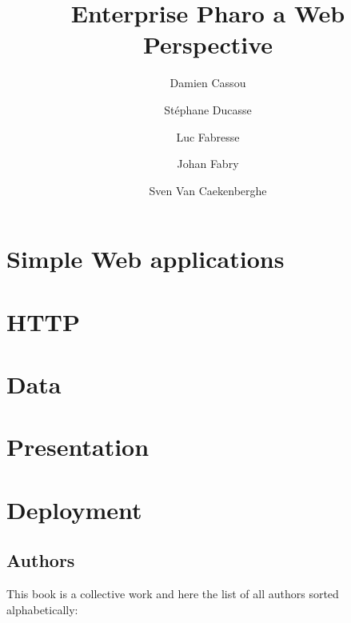 \documentclass[10pt,twoside,showtrims]{support/latex/sbabook}
\title{Enterprise Pharo\titlebreak{:} a Web Perspective}
\author{
    Damien Cassou \and
    Stéphane Ducasse \and
    Luc Fabresse \and
    Johan Fabry \and
    Sven Van Caekenberghe}
\begin{document}
\begin{titlingpage}
    \maketitle
\end{titlingpage}

\frontmatter


\tableofcontents

\mainmatter

\part{Simple Web applications}



\part{HTTP}






\part{Data}






\part{Presentation}





\part{Deployment}


\backmatter

\appendix
\appendixpage

\chapter{Authors}

This book is a collective work and here the list of all authors sorted alphabetically:
\end{document}
